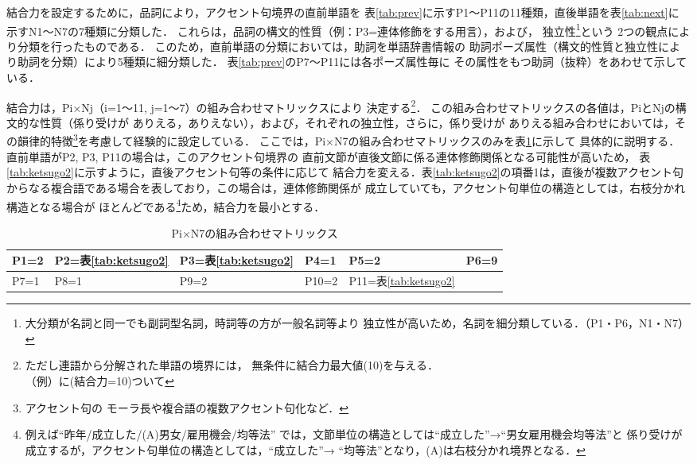 結合力を設定するために，品詞により，アクセント句境界の直前単語を
表\ref{tab:prev}に示すP1〜P11の11種類，直後単語を表\ref{tab:next}に
示すN1〜N7の7種類に分類した．
これらは，品詞の構文的性質（例：P3=連体修飾をする用言），および，
独立性\footnote{大分類が名詞と同一でも副詞型名詞，時詞等の方が一般名詞等より
独立性が高いため，名詞を細分類している．（P1・P6，N1・N7）}という
2つの観点により分類を行ったものである．
このため，直前単語の分類においては，助詞を単語辞書情報の
助詞ポーズ属性（構文的性質と独立性により助詞を分類）により5種類に細分類した．
表\ref{tab:prev}のP7〜P11には各ポーズ属性毎に
その属性をもつ助詞（抜粋）をあわせて示している．

結合力は，Pi×Nj（i=1〜11, j=1〜7）の組み合わせマトリックスにより
決定する\footnote{ただし連語から分解された単語の境界には，
無条件に結合力最大値(10)を与える．\\
（例）{\dg に}(結合力=10){\dg ついて}}．
この組み合わせマトリックスの各値は，PiとNjの構文的な性質（係り受けが
ありえる，ありえない），および，それぞれの独立性，さらに，係り受けが
ありえる組み合わせにおいては，その韻律的特徴\footnote{アクセント句の
モーラ長や複合語の複数アクセント句化など．}を考慮して経験的に設定している．
ここでは，Pi×N7の組み合わせマトリックスのみを表\ref{tab:ketsugo}に示して
具体的に説明する．
直前単語がP2, P3, P11の場合は，このアクセント句境界の
直前文節が直後文節に係る連体修飾関係となる可能性が高いため，
表\ref{tab:ketsugo2}に示すように，直後アクセント句等の条件に応じて
結合力を変える．表\ref{tab:ketsugo2}の項番1は，直後が複数アクセント句
からなる複合語である場合を表しており，この場合は，連体修飾関係が
成立していても，アクセント句単位の構造としては，右枝分かれ構造となる場合が
ほとんどである\footnote{例えば``昨年/成立した/(A)男女/雇用機会/均等法''
では，文節単位の構造としては``成立した''→``\mbox{男女雇用機会均等}法''と
係り受けが成立するが，アクセント句単位の構造としては，``成立した''→
``均等法''となり，(A)は右枝分かれ境界となる．}ため，結合力を最小とする．

\begin{table}
\caption{Pi×N7の組み合わせマトリックス}
\label{tab:ketsugo}
\begin{center}
\begin{tabular}{|l|l|l|l|l|l|}\hline
P1=2 & P2=表\ref{tab:ketsugo2} & P3=表\ref{tab:ketsugo2} & P4=1  &
P5=2 & P6=9 \\ \hline
P7=1 & P8=1  & P9=2 & P10=2 & P11=表\ref{tab:ketsugo2} & \\ \hline
\end{tabular}
\end{center}
\end{table}

